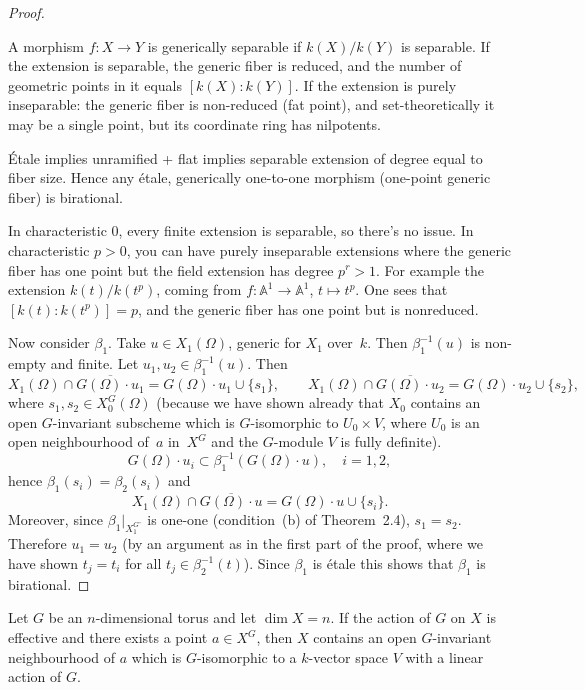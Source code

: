 \documentclass[12pt]{article}
\begin{document}
\begin{proof}
\begin{remark}
   A morphism $f : X \to Y$ is generically separable if $k(X)/k(Y)$ is separable. If the extension is separable, the generic fiber is reduced, and the number of geometric points in it equals $[k(X):k(Y)]$. If the extension is purely inseparable: the generic fiber is non-reduced (fat point), and set-theoretically it may be a single point, but its coordinate ring has nilpotents.

Étale implies unramified + flat implies separable extension of degree equal to fiber size. Hence any étale, generically one-to-one morphism (one-point generic fiber) is birational. 

In characteristic 0, every finite extension is separable, so there's no issue. In characteristic $p>0$, you can have purely inseparable extensions where the generic fiber has one point but the field extension has degree $p^r>1$. For example the extension $k(t)/k(t^p)$, coming from $f:\mathbb{A}^1\to\mathbb{A}^1$, $t\mapsto t^p$. One sees that $[k(t):k(t^p)] = p$, and the generic fiber has one point but is nonreduced.
\end{remark}

Now consider $\beta_1$.
Take $u\in X_1(\Omega)$, generic for $X_1$ over~$k$.
Then $\beta_1^{-1}(u)$ is non-empty and finite.
Let $u_1,u_2\in\beta_1^{-1}(u)$.
Then
\[
  X_1(\Omega)\cap \overline{G(\Omega)\cdot u_1}
     = G(\Omega)\cdot u_1\cup\{s_1\},
  \qquad
  X_1(\Omega)\cap \overline{G(\Omega)\cdot u_2}
     = G(\Omega)\cdot u_2\cup\{s_2\},
\]
where $s_1,s_2\in X_0^G(\Omega)$
(because we have shown already that $X_0$ contains an open
$G$-invariant subscheme which is $G$-isomorphic to
$U_0\times V$, where $U_0$ is an open neighbourhood of~$a$ in~$X^G$
and the $G$-module $V$ is fully definite).
\[
  G(\Omega)\cdot u_i \subset \beta_1^{-1}(G(\Omega)\cdot u),
  \quad i=1,2,
\]
hence $\beta_1(s_i)=\beta_2(s_i)$ and
\[
  X_1(\Omega)\cap \overline{G(\Omega)\cdot u}
    = G(\Omega)\cdot u\cup\{s_i\}.
\]
Moreover, since $\beta_1|_{X_1^{G^\circ}}$ is one-one
(condition~(b) of Theorem~2.4),
$s_1=s_2$.
Therefore $u_1=u_2$ (by an argument as in the first part of the proof,
where we have shown $t_j=t_i$ for all $t_j\in\beta_2^{-1}(t)$).
Since $\beta_1$ is \'etale this shows that $\beta_1$ is birational. \end{proof}

\begin{corollary}
Let $G$ be an $n$-dimensional torus and let $\dim X = n$.
If the action of $G$ on $X$ is effective and there exists a point $a \in X^G$, 
then $X$ contains an open $G$-invariant neighbourhood of $a$ which is 
$G$-isomorphic to a $k$-vector space $V$ with a linear action of $G$.
\end{corollary}
\end{document}
